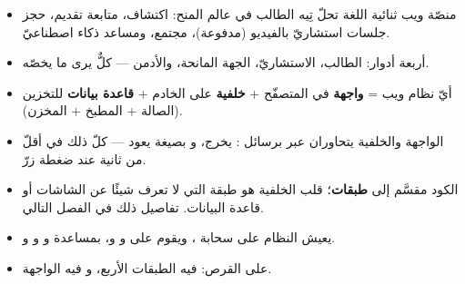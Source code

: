 \begin{summary}
\begin{itemize}
\item {} منصّة ويب ثنائية اللغة تحلّ تِيه الطالب في عالم المنح: اكتشاف،
متابعة تقديم، حجز جلسات استشاريّ بالفيديو (مدفوعة)، مجتمع، ومساعد ذكاء اصطناعيّ.
\item أربعة أدوار: الطالب، الاستشاريّ، الجهة المانحة، والأدمن — كلٌّ يرى ما يخصّه.
\item أيّ نظام ويب = \textbf{واجهة} في المتصفّح + \textbf{خلفية} على الخادم +
\textbf{قاعدة بيانات} للتخزين (الصالة + المطبخ + المخزن).
\item الواجهة والخلفية يتحاوران عبر  برسائل :  يخرج،
و بصيغة  يعود — كلّ ذلك في أقلّ من ثانية عند ضغطة زرّ.
\item الكود مقسَّم إلى \textbf{طبقات}؛ قلب الخلفية هو طبقة  التي لا تعرف
شيئًا عن الشاشات أو قاعدة البيانات. تفاصيل ذلك في الفصل التالي.
\item يعيش النظام على سحابة ، ويقوم على  و
و، بمساعدة  و و و.
\item على القرص:  فيه الطبقات الأربع، و فيه الواجهة.
\end{itemize}
\end{summary}
